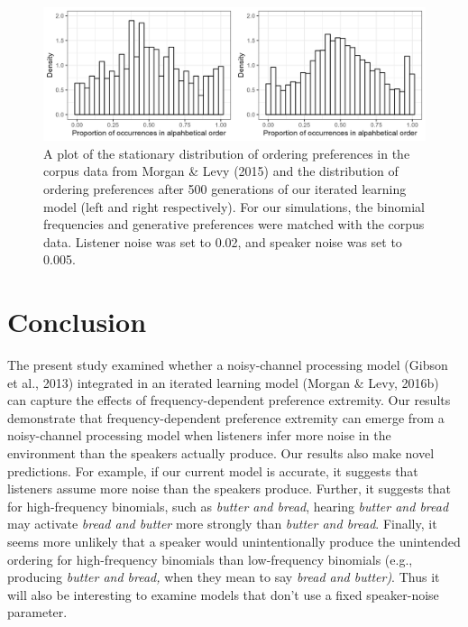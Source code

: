 \documentclass[10pt, letterpaper, hidelinks]{article}
\newenvironment{CodeChunk}{}{}
\begin{document}
\begin{CodeChunk}
\begin{figure}[!htb]

{\centering \includegraphics[width=1\linewidth]{Figures/corpus_plot_and_ours} 

}

\caption[A plot of the stationary distribution of ordering preferences in the corpus data from Morgan \& Levy (2015) and the distribution of ordering preferences after 500 generations of our iterated learning model (left and right respectively)]{A plot of the stationary distribution of ordering preferences in the corpus data from Morgan \& Levy (2015) and the distribution of ordering preferences after 500 generations of our iterated learning model (left and right respectively). For our simulations, the binomial frequencies and generative preferences were matched with the corpus data. Listener noise was set to 0.02, and speaker noise was set to 0.005.}\label{fig:corpusourmodel}
\end{figure}
\end{CodeChunk}

\hypertarget{conclusion}{%
\section{Conclusion}\label{conclusion}}

The present study examined whether a noisy-channel processing model
(Gibson et al., 2013) integrated in an iterated learning model (Morgan
\& Levy, 2016b) can capture the effects of frequency-dependent
preference extremity. Our results demonstrate that frequency-dependent
preference extremity can emerge from a noisy-channel processing model
when listeners infer more noise in the environment than the speakers
actually produce. Our results also make novel predictions. For example,
if our current model is accurate, it suggests that listeners assume more
noise than the speakers produce. Further, it suggests that for
high-frequency binomials, such as \emph{butter and bread}, hearing
\emph{butter and bread} may activate \emph{bread and butter} more
strongly than \emph{butter and bread}. Finally, it seems more unlikely
that a speaker would unintentionally produce the unintended ordering for
high-frequency binomials than low-frequency binomials (e.g., producing
\emph{butter and bread,} when they mean to say \emph{bread and butter)}.
Thus it will also be interesting to examine models that don't use a
fixed speaker-noise parameter.
\end{document}

